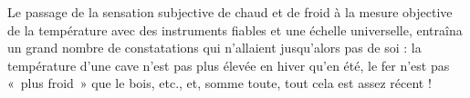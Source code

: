	Le passage de la sensation subjective de chaud et de froid à la mesure objective de la température avec des instruments fiables et une échelle universelle, entraîna un grand nombre de constatations qui n'allaient jusqu'alors pas de soi : la température d'une cave n'est pas plus élevée en hiver qu'en été, le fer n'est pas «~plus froid~» que le bois, etc., et, somme toute, tout cela est assez récent !

\atendofhistorysection
